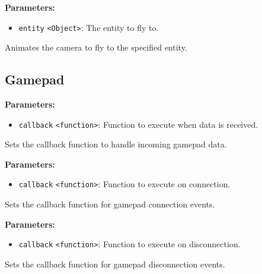 \documentclass[12pt,a4paper]{article}
\begin{document}
\noindent \textbf{Parameters:}
\begin{itemize}
  \item \texttt{entity} \texttt{<Object>}: The entity to fly to.
\end{itemize}

\noindent Animates the camera to fly to the specified entity.


\subsection{Gamepad}
\vspace{5mm}
\noindent {}


\noindent \textbf{Parameters:}
\begin{itemize}
  \item \texttt{callback} \texttt{<function>}: Function to execute when data is received.
\end{itemize}

\noindent Sets the callback function to handle incoming gamepad data.

\vspace{5mm}
\noindent {}


\noindent \textbf{Parameters:}
\begin{itemize}
  \item \texttt{callback} \texttt{<function>}: Function to execute on connection.
\end{itemize}

\noindent Sets the callback function for gamepad connection events.

\vspace{5mm}
\noindent {}


\noindent \textbf{Parameters:}
\begin{itemize}
  \item \texttt{callback} \texttt{<function>}: Function to execute on disconnection.
\end{itemize}

\noindent Sets the callback function for gamepad disconnection events.
\end{document}
